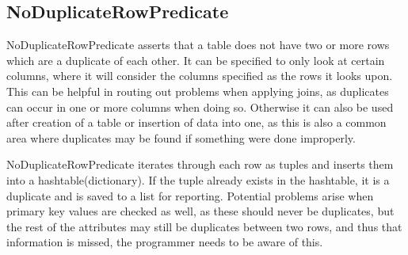 \subsection{NoDuplicateRowPredicate}

NoDuplicateRowPredicate asserts that a table does not have two or more rows which are a duplicate of each other. It can be specified to only look at certain columns, where it will consider the columns specified as the rows it looks upon. This can be helpful in routing out problems when applying joins, as duplicates can occur in one or more columns when doing so. Otherwise it can also be used after creation of a table or insertion of data into one, as this is also a common area where duplicates may be found if something were done improperly.
 

NoDuplicateRowPredicate iterates through each row as tuples and inserts them into a hashtable(dictionary). If the tuple already exists in the hashtable, it is a duplicate and is saved to a list for reporting.
Potential problems arise when primary key values are checked as well, as these should never be duplicates, but the rest of the attributes may still be duplicates between two rows, and thus that information is missed, the programmer needs to be aware of this.

